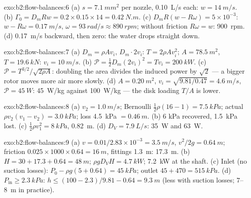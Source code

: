 \begin{solution}{exo:b2:flow-balances:6}
(a) $s = \qty{7.1}{mm^2}$ per nozzle, \qty{0.10}{L/s} each: $w = \qty{14}{m/s}$. (b)
$\Gamma_0 = D_mRw = 0.2 \times 0.15 \times 14 = \qty{0.42}{N.m}$. (c) $D_mR(w - R\omega) =
5 \times 10^{-3}$: $w - R\omega = \qty{0.17}{m/s}$, $\omega = \qty{93}{rad/s} \approx \qty{890}{rpm}$;
without friction $R\omega = w$: \qty{900}{rpm}. (d) \qty{0.17}{m/s} backward, then
zero: the water drops straight down.
\end{solution}

\begin{solution}{exo:b2:flow-balances:7}
(a) $D_m = \rho Av_i$,  $D_m\cdot2v_i$: $T = 2\rho Av_i^2$; $A = \qty{78.5}{m^2}$,
$T = \qty{19.6}{kN}$: $v_i = \qty{10}{m/s}$. (b) $\mathcal P = \tfrac12D_m(2v_i)^2 = Tv_i =
\qty{200}{kW}$. (c) $\mathcal P = T^{3/2}/\sqrt{2\rho A}$: doubling the area
divides the induced power by $\sqrt2$ --- a bigger rotor moves more air
more slowly. (d) $A = \qty{0.20}{m^2}$, $v_i = \sqrt{9.81/0.47} = \qty{4.6}{m/s}$, $\mathcal P
= \qty{45}{W}$: \qty{45}{W/kg} against \qty{100}{W/kg} --- the disk loading $T/A$
is lower.
\end{solution}

\begin{solution}{exo:b2:flow-balances:8}
(a) $v_2 = \qty{1.0}{m/s}$; Bernoulli $\tfrac12\rho(16 - 1) = \qty{7.5}{kPa}$; actual
$\rho v_2(v_1 - v_2) = \qty{3.0}{kPa}$; loss \qty{4.5}{kPa} $= \qty{0.46}{m}$. (b) $6$ kPa
recovered, \qty{1.5}{kPa} lost. (c) $\tfrac12\rho v_1^2 = \qty{8}{kPa}$, \qty{0.82}{m}. (d)
$D_V = \qty{7.9}{L/s}$: \qty{35}{W} and \qty{63}{W}.
\end{solution}

\begin{solution}{exo:b2:flow-balances:9}
(a) $v = 0.01/2.83 \times 10^{-3} = \qty{3.5}{m/s}$, $v^2/2g = \qty{0.64}{m}$; friction
$0.025 \times 1000 \times 0.64 = \qty{16}{m}$, fittings \qty{1.3}{m}: \qty{17.3}{m}. (b)
$H = 30 + 17.3 + 0.64 = \qty{48}{m}$; $\rho gD_VH = \qty{4.7}{kW}$; \qty{7.2}{kW} at the
shaft. (c) Inlet (no suction losses): $P_0 - \rho g(5 + 0.64) = \qty{45}{kPa}$;
outlet $45 + 470 = \qty{515}{kPa}$. (d) $P_{\text{in}} \ge \qty{2.3}{kPa}$: $h \le (100 -
2.3)/9.81 - 0.64 = \qty{9.3}{m}$ (less with suction losses; $7$--\qty{8}{m} in
practice).
\end{solution}

